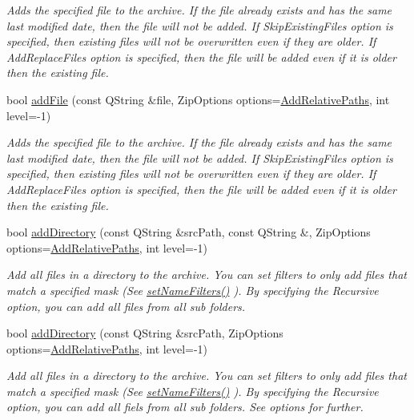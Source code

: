 \begin{DoxyCompactItemize}
\begin{DoxyCompactList}\small\item\em Adds the specified file to the archive. If the file already exists and has the same last modified date, then the file will not be added. If Skip\+Existing\+Files option is specified, then existing files will not be overwritten even if they are older. If Add\+Replace\+Files option is specified, then the file will be added even if it is older then the existing file. \end{DoxyCompactList}\item 
bool \hyperlink{class_ab_zip_aa71d315aae5caaab47e1a90b5fae6ceb}{add\+File} (const Q\+String \&file, Zip\+Options options=\hyperlink{class_ab_zip_a9c4f57d6b8d9a449c2eb6c4d4e53c9d5a9fe2234f7fddcfdae76f8aeb8c3c2d44}{Add\+Relative\+Paths}, int level=-\/1)
\begin{DoxyCompactList}\small\item\em Adds the specified file to the archive. If the file already exists and has the same last modified date, then the file will not be added. If Skip\+Existing\+Files option is specified, then existing files will not be overwritten even if they are older. If Add\+Replace\+Files option is specified, then the file will be added even if it is older then the existing file. \end{DoxyCompactList}\item 
bool \hyperlink{class_ab_zip_ae4ad67e2d39ff729f648d12ec89b8ea0}{add\+Directory} (const Q\+String \&src\+Path, const Q\+String \&, Zip\+Options options=\hyperlink{class_ab_zip_a9c4f57d6b8d9a449c2eb6c4d4e53c9d5a9fe2234f7fddcfdae76f8aeb8c3c2d44}{Add\+Relative\+Paths}, int level=-\/1)
\begin{DoxyCompactList}\small\item\em Add all files in a directory to the archive. You can set filters to only add files that match a specified mask (See \hyperlink{class_ab_zip_a80724c61b6812aaea06f575860bed8e6}{set\+Name\+Filters()} ). By specifying the Recursive option, you can add all files from all sub folders. \end{DoxyCompactList}\item 
bool \hyperlink{class_ab_zip_a3345e5c1542f71379ca7086267f090fd}{add\+Directory} (const Q\+String \&src\+Path, Zip\+Options options=\hyperlink{class_ab_zip_a9c4f57d6b8d9a449c2eb6c4d4e53c9d5a9fe2234f7fddcfdae76f8aeb8c3c2d44}{Add\+Relative\+Paths}, int level=-\/1)
\begin{DoxyCompactList}\small\item\em Add all files in a directory to the archive. You can set filters to only add files that match a specified mask (See \hyperlink{class_ab_zip_a80724c61b6812aaea06f575860bed8e6}{set\+Name\+Filters()} ). By specifying the Recursive option, you can add all fiels from all sub folders. See options for further. \end{DoxyCompactList}\item 

\end{DoxyCompactItemize}
